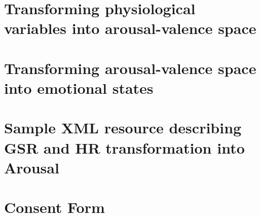 \documentclass{uofsthesis-cs}
\begin{document}


\uofsappendix
\chapter{Transforming physiological variables into arousal-valence space} \label{app:phys-to-av}    
\chapter{Transforming arousal-valence space into emotional states}        \label{app:av-to-emotion} 
\chapter{Sample XML resource describing GSR and HR transformation into Arousal}
                                                                          \label{app:gsr-hr-to-arousal} 
\chapter{Consent Form}                                                    \label{app:consent}       \addtolength{\wpYoffset}{-1.6cm}
\end{document}
